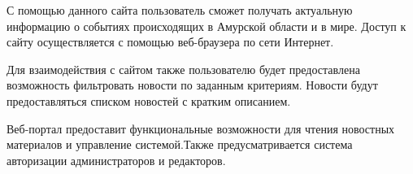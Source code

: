 С помощью данного сайта пользователь сможет получать актуальную информацию о событиях происходящих в Амурской области и в мире. Доступ к сайту осуществляется с помощью веб-браузера по сети Интернет. 

Для взаимодействия с сайтом также пользователю будет предоставлена возможность фильтровать новости по заданным критериям. Новости будут предоставляться списком новостей с кратким описанием.

Веб-портал предоставит функциональные возможности для чтения новостных материалов и управление системой.Также предусматривается система авторизации администраторов и редакторов.


%
%
%
